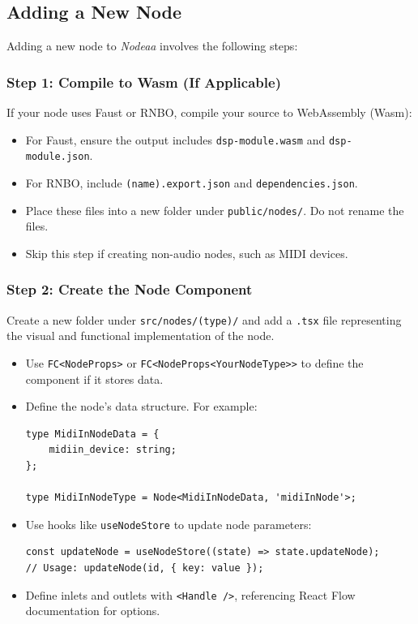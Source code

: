 \documentclass[10pt,twocolumn]{article}
\begin{document}
\subsection{Adding a New Node}
Adding a new node to \textit{Nodeaa} involves the following steps:

\subsubsection{Step 1: Compile to Wasm (If Applicable)}
If your node uses Faust or RNBO, compile your source to WebAssembly (Wasm):
\begin{itemize}
    \item For Faust, ensure the output includes \texttt{dsp-module.wasm} and \texttt{dsp-module.json}.
    \item For RNBO, include \texttt{(name).export.json} and \texttt{dependencies.json}.
    \item Place these files into a new folder under \texttt{public/nodes/}. Do not rename the files.
    \item Skip this step if creating non-audio nodes, such as MIDI devices.
\end{itemize}

\subsubsection{Step 2: Create the Node Component}
Create a new folder under \texttt{src/nodes/(type)/} and add a \texttt{.tsx} file representing the visual and functional implementation of the node.
\begin{itemize}
    \item Use \texttt{FC\textless{}NodeProps\textgreater{}} or \texttt{FC\textless{}NodeProps\textless{}YourNodeType\textgreater{}\textgreater{}} to define the component if it stores data.
    \item Define the node's data structure. For example:
\begin{lstlisting}
type MidiInNodeData = {
    midiin_device: string;
};

type MidiInNodeType = Node<MidiInNodeData, 'midiInNode'>;
\end{lstlisting}
    \item Use hooks like \texttt{useNodeStore} to update node parameters:
\begin{lstlisting}
const updateNode = useNodeStore((state) => state.updateNode);
// Usage: updateNode(id, { key: value });
\end{lstlisting}
    \item Define inlets and outlets with \texttt{\textless{}Handle /\textgreater{}}, referencing React Flow documentation for options.
\end{itemize}
\end{document}
